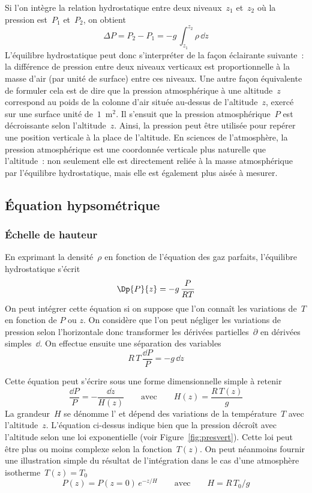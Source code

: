 \sk
Si l'on intègre la relation hydrostatique entre deux niveaux~$z_1$ et~$z_2$ où la pression est~$P_1$ et~$P_2$, on obtient
\[ \Delta P = P_2 - P_1 = - g \, \int_{z_1}^{z_2} \rho \, \dd z \]
L'équilibre hydrostatique peut donc s'interpréter de la façon éclairante suivante~: la différence de pression entre deux niveaux verticaux est proportionnelle à la masse d'air (par unité de surface) entre ces niveaux. Une autre façon équivalente de formuler cela est de dire que la pression atmosphérique à une altitude~$z$ correspond au poids de la colonne d'air située au-dessus de l'altitude~$z$, exercé sur une surface unité de~$1$~m$^2$. Il s'ensuit que la pression atmosphérique~$P$ est décroissante selon l'altitude~$z$. Ainsi, la pression peut être utilisée pour repérer une position verticale à la place de l'altitude. En sciences de l'atmosphère, la pression atmosphérique est une coordonnée verticale plus naturelle que l'altitude~: non seulement elle est directement reliée à la masse atmosphérique par l'équilibre hydrostatique, mais elle est également plus aisée à mesurer.

\sk
\subsection{\'Equation hypsométrique}

\sk
\subsubsection{\'Echelle de hauteur}

\sk
En exprimant la densité~$\rho$ en fonction de l'équation des gaz parfaits, l'équilibre hydrostatique s'écrit
\[ \Dp{P}{z} = - g \, \frac{P}{RT} \]
On peut intégrer cette équation si on suppose que l'on connaît les variations de~$T$ en fonction de $P$ ou $z$. On considère que l'on peut négliger les variations de pression selon l'horizontale donc transformer les dérivées partielles~$\partial$ en dérivées simples~$\dd$. On effectue ensuite une séparation des variables
\[R \, T \, \frac{\dd P}{P} = - g \, \dd z\]

\sk
Cette équation peut s'écrire sous une forme dimensionnelle simple à retenir
\[ \boxed{ \frac{\dd P}{P} = - \frac{\dd z}{H(z)} \qquad \text{avec} \qquad H(z) = \frac{R \, T(z)}{g} } \]
La grandeur~$H$ se dénomme l' et dépend des variations de la température~$T$ avec l'altitude~$z$. L'équation ci-dessus indique bien que la pression décroît avec l'altitude selon une loi exponentielle (voir Figure~\ref{fig:presvert}). Cette loi peut être plus ou moins complexe selon la fonction~$T(z)$. On peut néanmoins fournir une illustration simple du résultat de l'intégration dans le cas d'une atmosphère isotherme~$T(z)=T_0$
\[ P(z) = P(z=0) \, e^{-z/H} \qquad \text{avec} \qquad H = R \, T_0 / g \]

